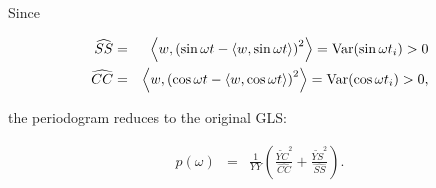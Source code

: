 \documentclass[notitlepage]{article}
\newcommand{\YC}[1][n]{\widetilde{YC}}
\newcommand{\YS}[1][n]{\widetilde{YS}}
\newcommand{\YY}{YY}
\newcommand{\hatCC}[1][nm]{\widehat{CC}}
\newcommand{\hatSS}[1][nm]{\widehat{SS}}
\newcommand{\iprod}[2]{\left<#1, #2\right>}
\begin{document}
Since 

\begin{eqnarray}
\hatSS &=& \iprod{w}{\left(\sin{\omega t} - \iprod{w}{\sin{\omega t}}\right)^2} = {\rm Var}(\sin{\omega t_i}) > 0\\
\hatCC &=& \iprod{w}{\left(\cos{\omega t} - \iprod{w}{\cos{\omega t}}\right)^2} = {\rm Var}(\cos{\omega t_i}) > 0,
\end{eqnarray}

the periodogram reduces to the original GLS:

\begin{eqnarray}
p(\omega) &=& \frac{1}{\YY}\left(\frac{\YC^2}{\hatCC} + \frac{\YS^2}{\hatSS}\right).
\end{eqnarray}





\end{document}
